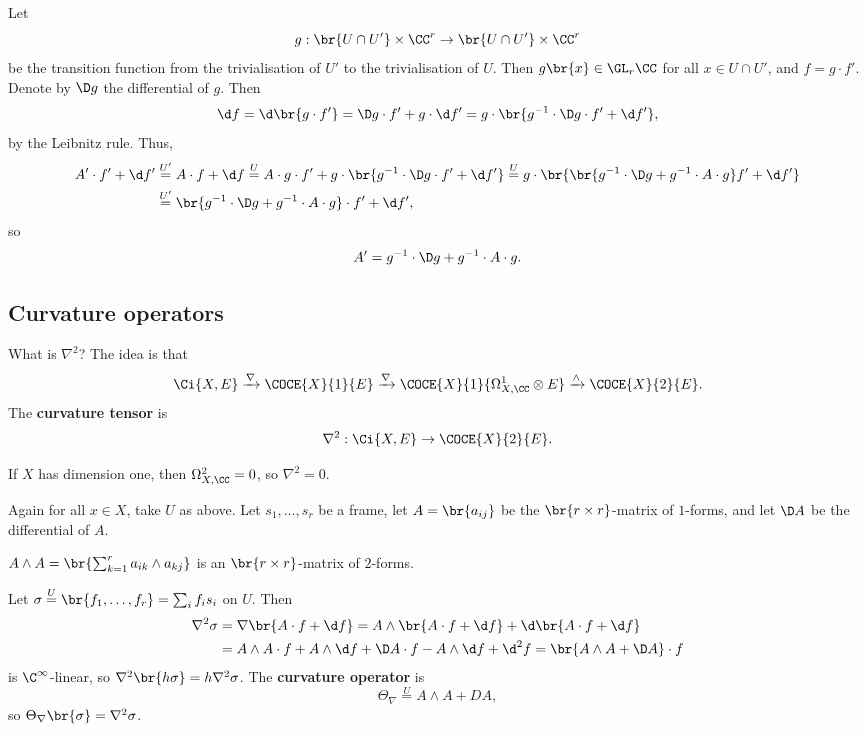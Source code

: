 \pagebreak


Let
$$ g : \br{U \cap U'} \times \CC^r \to \br{U \cap U'} \times \CC^r $$
be the transition function from the trivialisation of $ U' $ to the trivialisation of $ U $. Then $ g\br{x} \in \GL_r \CC $ for all $ x \in U \cap U' $, and $ f = g \cdot f' $. Denote by $ \D g $ the differential of $ g $. Then
$$ \d f = \d\br{g \cdot f'} = \D g \cdot f' + g \cdot \d f' = g \cdot \br{g^{-1} \cdot \D g \cdot f' + \d f'}, $$
by the Leibnitz rule. Thus,
\begin{align*}
A' \cdot f' + \d f'
& \overset{U'}{=} A \cdot f + \d f
\overset{U}{=} A \cdot g \cdot f' + g \cdot \br{g^{-1} \cdot \D g \cdot f' + \d f'}
\overset{U}{=} g \cdot \br{\br{g^{-1} \cdot \D g + g^{-1} \cdot A \cdot g}f' + \d f'} \\
& \overset{U'}{=} \br{g^{-1} \cdot \D g + g^{-1} \cdot A \cdot g} \cdot f' + \d f',
\end{align*}
so
$$ A' = g^{-1} \cdot \D g + g^{-1} \cdot A \cdot g. $$

\subsection{Curvature operators}

What is $ \nabla^2 $? The idea is that
$$ \Ci{X, E} \xrightarrow{\nabla} \COCE{X}{1}{E} \xrightarrow{\nabla} \COCE{X}{1}{\Omega_{X, \CC}^1 \otimes E} \xrightarrow{\wedge} \COCE{X}{2}{E}. $$
The \textbf{curvature tensor} is
$$ \nabla^2 : \Ci{X, E} \to \COCE{X}{2}{E}. $$

\begin{remark*}
If $ X $ has dimension one, then $ \Omega_{X, \CC}^2 = 0 $, so $ \nabla^2 = 0 $.
\end{remark*}

Again for all $ x \in X $, take $ U $ as above. Let $ s_1, \dots, s_r $ be a frame, let $ A = \br{a_{ij}} $ be the $ \br{r \times r} $-matrix of $ 1 $-forms, and let $ \D A $ be the differential of $ A $.

\begin{notation*}
$ A \wedge A = \br{\sum_{k = 1}^r a_{ik} \wedge a_{kj}} $ is an $ \br{r \times r} $-matrix of $ 2 $-forms.
\end{notation*}

Let $ \sigma \overset{U}{=} \br{f_1, \dots, f_r} = \sum_i f_is_i $ on $ U $. Then
\begin{align*}
\nabla^2\sigma
& = \nabla\br{A \cdot f + \d f}
= A \wedge \br{A \cdot f + \d f} + \d\br{A \cdot f + \d f} \\
& = A \wedge A \cdot f + A \wedge \d f + \D A \cdot f - A \wedge \d f + \d^2f
= \br{A \wedge A + \D A} \cdot f
\end{align*}
is $ \C^\infty $-linear, so $ \nabla^2\br{h\sigma} = h\nabla^2\sigma $. The \textbf{curvature operator} is
$$ \Theta_\nabla \overset{U}{=} A \wedge A + DA, $$
so $ \Theta_\nabla\br{\sigma} = \nabla^2\sigma $.

